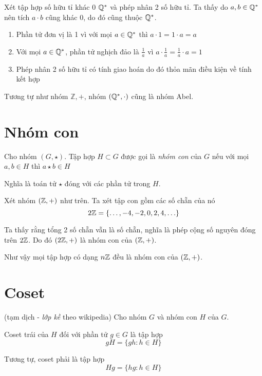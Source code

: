 \begin{example}
    Xét tập hợp số hữu tỉ khác 0 $\mathbb{Q}^*$ và phép nhân 2 số hữu tỉ. Ta thấy do $a, b \in \mathbb{Q}^*$ nên tích $a \cdot b$ cũng khác 0, do đó cũng thuộc $\mathbb{Q}^*$.
    \begin{enumerate}[noitemsep]
        \item Phần tử đơn vị là 1 vì với mọi $a \in \mathbb{Q}^*$ thì $a \cdot 1 = 1 \cdot a = a$
        \item Với mọi $a \in \mathbb{Q}^*$, phần tử nghịch đảo là $\frac{1}{a}$ vì $a \cdot \frac{1}{a} = \frac{1}{a} \cdot a = 1$
        \item Phép nhân 2 số hữu tỉ có tính giao hoán do đó thỏa mãn điều kiện về tính kết hợp
    \end{enumerate}
    Tương tự như nhóm $\mathbb{Z, +}$, nhóm $(\mathbb{Q}^*, \cdot)$ cũng là nhóm Abel.
\end{example}

\section{Nhóm con}

\begin{definition}
    Cho nhóm $(G, \star)$. Tập hợp $H \subset G$ được gọi là \textit{nhóm con} của $G$ nếu với mọi $a, b \in H$ thì $a \star b \in H$
\end{definition}
 
Nghĩa là toán tử $\star$ đóng với các phần tử trong $H$.

\begin{example}
    Xét nhóm $(\mathbb{Z}, +)$ như trên. Ta xét tập con gồm các số chẵn của nó
    \[2\mathbb{Z} = \{\ldots, -4, -2, 0, 2, 4, \ldots\}\]

    Ta thấy rằng tổng 2 số chẵn vẫn là số chẵn, nghĩa là phép cộng số nguyên đóng trên $2\mathbb{Z}$.
    Do đó $(2\mathbb{Z}, +)$ là nhóm con của $(\mathbb{Z}, +)$.

    Như vậy mọi tập hợp có dạng $n \mathbb{Z}$ đều là nhóm con của $(\mathbb{Z}, +)$.
\end{example}

\section{Coset}

\begin{definition}[Coset]
    (tạm dịch - \textit{lớp kề} theo wikipedia) Cho nhóm $G$ và nhóm con $H$ của $G$.

    Coset trái của $H$ đối với phần tử $g \in G$ là tập hợp
    \[gH = \{gh : h \in H \}\]

    Tương tự, coset phải là tập hợp
    \[Hg = \{hg : h \in H \}\]
\end{definition}

